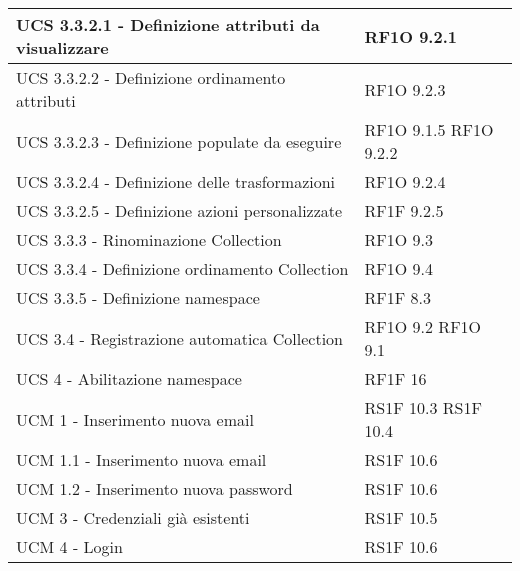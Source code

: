 \begin{center}
\begin{longtable}{ | p{5cm} | p{5cm} |}
            UCS 3.3.2.1 -  Definizione attributi da visualizzare &  RF1O 9.2.1 \newline  \\ \hline      
            UCS 3.3.2.2 - Definizione ordinamento attributi &  RF1O 9.2.3 \newline  \\ \hline      
            UCS 3.3.2.3 - Definizione populate da eseguire &  RF1O 9.1.5 \newline  RF1O 9.2.2 \newline  \\ \hline      
            UCS 3.3.2.4 - Definizione delle trasformazioni &  RF1O 9.2.4 \newline  \\ \hline      
            UCS 3.3.2.5 - Definizione azioni personalizzate &  RF1F 9.2.5 \newline  \\ \hline      
            UCS 3.3.3  - Rinominazione Collection &  RF1O 9.3 \newline  \\ \hline      
            UCS 3.3.4  - Definizione ordinamento Collection &  RF1O 9.4 \newline  \\ \hline      
            UCS 3.3.5 - Definizione namespace &  RF1F 8.3 \newline  \\ \hline      
            UCS 3.4  - Registrazione automatica Collection &  RF1O 9.2 \newline  RF1O 9.1 \newline  \\ \hline      
            UCS 4 - Abilitazione namespace &  RF1F 16 \newline  \\ \hline      
            UCM 1 -  Inserimento nuova email &  RS1F 10.3 \newline  RS1F 10.4 \newline  \\ \hline      
            UCM 1.1 -  Inserimento nuova email &  RS1F 10.6 \newline  \\ \hline      
            UCM 1.2 - Inserimento nuova password &  RS1F 10.6 \newline  \\ \hline      
            UCM 3 - Credenziali già esistenti &  RS1F 10.5 \newline  \\ \hline      
            UCM 4 - Login &  RS1F 10.6 \newline  \\ \hline      

\end{longtable}
\end{center}
